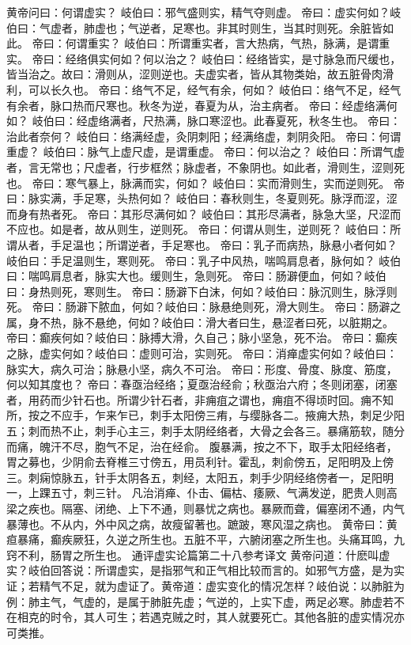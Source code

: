 \documentclass[a4paper,12pt,UTF8,twoside]{ctexbook}
\begin{document}
黄帝问曰：何谓虚实？
岐伯曰：邪气盛则实，精气夺则虚。
帝曰：虚实何如？岐伯曰：气虚者，肺虚也；气逆者，足寒也。非其时则生，当其时则死。余脏皆如此。
帝曰：何谓重实？
岐伯曰：所谓重实者，言大热病，气热，脉满，是谓重实。
帝曰：经络俱实何如？何以治之？
岐伯曰：经络皆实，是寸脉急而尺缓也，皆当治之。故曰：滑则从，涩则逆也。夫虚实者，皆从其物类始，故五脏骨肉滑利，可以长久也。
帝曰：络气不足，经气有余，何如？
岐伯曰：络气不足，经气有余者，脉口热而尺寒也。秋冬为逆，春夏为从，治主病者。
帝曰：经虚络满何如？
岐伯曰：经虚络满者，尺热满，脉口寒涩也。此春夏死，秋冬生也。
帝曰：治此者奈何？
岐伯曰：络满经虚，灸阴刺阳；经满络虚，刺阴灸阳。
帝曰：何谓重虚？
岐伯曰：脉气上虚尺虚，是谓重虚。
帝曰：何以治之？
岐伯曰：所谓气虚者，言无常也；尺虚者，行步框然；脉虚者，不象阴也。如此者，滑则生，涩则死也。
帝曰：寒气暴上，脉满而实，何如？
岐伯曰：实而滑则生，实而逆则死。
帝曰：脉实满，手足寒，头热何如？
岐伯曰：春秋则生，冬夏则死。脉浮而涩，涩而身有热者死。
帝曰：其形尽满何如？
岐伯曰：其形尽满者，脉急大坚，尺涩而不应也。如是者，故从则生，逆则死。
帝曰：何谓从则生，逆则死？
岐伯曰：所谓从者，手足温也；所谓逆者，手足寒也。
帝曰：乳子而病热，脉悬小者何如？岐伯曰：手足温则生，寒则死。
帝曰：乳子中风热，喘鸣肩息者，脉何如？
岐伯曰：喘鸣肩息者，脉实大也。缓则生，急则死。
帝曰：肠澼便血，何如？岐伯曰：身热则死，寒则生。
帝曰：肠澼下白沫，何如？岐伯曰：脉沉则生，脉浮则死。
帝曰：肠澼下脓血，何如？岐伯曰：脉悬绝则死，滑大则生。
帝曰：肠澼之属，身不热，脉不悬绝，何如？岐伯曰：滑大者曰生，悬涩者曰死，以脏期之。
帝曰：癫疾何如？岐伯曰：脉搏大滑，久自己；脉小坚急，死不治。
帝曰：癫疾之脉，虚实何如？岐伯曰：虚则可治，实则死。
帝曰：消瘅虚实何如？岐伯曰：脉实大，病久可治；脉悬小坚，病久不可治。
帝曰：形度、骨度、脉度、筋度，何以知其度也？
帝曰：春亟治经络；夏亟治经俞；秋亟治六府；冬则闭塞，闭塞者，用药而少针石也。所谓少针石者，非痈疽之谓也，痈疽不得顷时回。痈不知所，按之不应手，乍来乍已，刺手太阳傍三痏，与缨脉各二。掖痈大热，刺足少阳五；刺而热不止，刺手心主三，刺手太阴经络者，大骨之会各三。暴痛筋软，随分而痛，魄汗不尽，胞气不足，治在经俞。
腹暴满，按之不下，取手太阳经络者，胃之募也，少阴俞去脊椎三寸傍五，用员利针。霍乱，刺俞傍五，足阳明及上傍三。刺痫惊脉五，针手太阴各五，刺经，太阳五，刺手少阴经络傍者一，足阳明一，上踝五寸，刺三针。
凡治消瘅、仆击、偏枯、痿厥、气满发逆，肥贵人则高梁之疾也。隔塞、闭绝、上下不通，则暴忧之病也。暴厥而聋，偏塞闭不通，内气暴薄也。不从内，外中风之病，故瘦留著也。蹠跛，寒风湿之病也。
黄帝曰：黄疸暴痛，癫疾厥狂，久逆之所生也。五脏不平，六腑闭塞之所生也。头痛耳鸣，九窍不利，肠胃之所生也。
通评虚实论篇第二十八参考译文
黄帝问道：什麽叫虚实？岐伯回答说：所谓虚实，是指邪气和正气相比较而言的。如邪气方盛，是为实证；若精气不足，就为虚证了。黄帝道：虚实变化的情况怎样？岐伯说：以肺脏为例：肺主气，气虚的，是属于肺脏先虚；气逆的，上实下虚，两足必寒。肺虚若不在相克的时令，其人可生；若遇克贼之时，其人就要死亡。其他各脏的虚实情况亦可类推。
\end{document}

